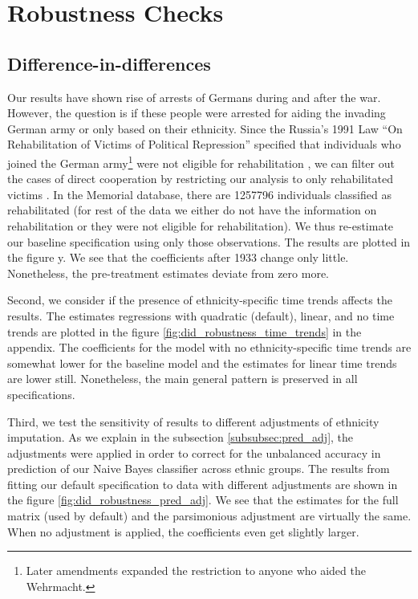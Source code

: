 

\section{Robustness Checks} \label{subsec:robust_checks}
\subsection{Difference-in-differences}

Our results have shown rise of arrests of Germans during and after the war. 
However, the question is if these people were arrested for aiding the invading German army or only based on their ethnicity. 
Since the  Russia’s 1991 Law  \enquote{On Rehabilitation of Victims of Political Repression} specified  that individuals who joined the German army\footnote{Later amendments expanded the restriction to anyone who aided the Wehrmacht. }  were not eligible for rehabilitation , we can filter out the cases of direct 
cooperation by restricting  our analysis to only rehabilitated victims \citep{frierson_russias_2014}. 
In the Memorial database, there  are 1257796 individuals  classified as  rehabilitated (for rest of the data we either do not have the information on rehabilitation or they were not eligible for rehabilitation).  We thus re-estimate our baseline specification using only those observations. The results are plotted in the figure y. We see that the coefficients after 1933 change only little. Nonetheless, the pre-treatment estimates deviate from zero more. 

Second, we consider if the presence of ethnicity-specific time trends affects the results.
The estimates regressions with quadratic (default), linear, and no time trends are  plotted in the figure \ref{fig:did_robustness_time_trends} in the appendix. The coefficients for the model with no ethnicity-specific time trends are somewhat lower for the baseline model and the estimates for linear time trends are lower still. Nonetheless, the main general pattern is preserved in all specifications.

Third, we test the sensitivity of results to different adjustments of ethnicity imputation. 
As we explain in the subsection \ref{subsubsec:pred_adj}, the adjustments were applied in order to correct for the unbalanced accuracy in prediction of our Naive Bayes classifier across ethnic groups. The results from fitting our default specification to data with different adjustments are shown in the figure \ref{fig:did_robustness_pred_adj}.
We see that the estimates for the full matrix (used by default) and the parsimonious adjustment are virtually the same. When no adjustment is applied, the coefficients even get slightly larger. 
